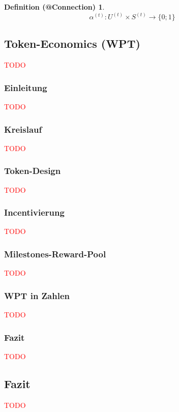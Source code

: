 \documentclass[11pt]{scrartcl}
\makeatletter
\newtheorem{def_connections}{Definition (@Connection)}
\newcommand\todo[1]{\textcolor{red}{#1}}
\makeatother
\begin{document}
\begin{def_connections}
\begin{equation*}
  \alpha^{(t)} : U^{(t)} \times S^{(t)} \rightarrow \{0; 1\}
\end{equation*}
\end{def_connections}


\subsection{Token-Economics (WPT)}
\label{sec:eco_wpt}
\todo{TODO}

\subsubsection{Einleitung}
\label{sec:wpt_einleitung}
\todo{TODO}

\subsubsection{Kreislauf}
\label{sec:wpt_kreislauf}
\todo{TODO}

\subsubsection{Token-Design}
\label{sec:wpt_design}
\todo{TODO}

\subsubsection{Incentivierung}
\label{sec:wpt_incent}
\todo{TODO}

\subsubsection{Milestones-Reward-Pool}
\label{sec:wpt_reward_pool}
\todo{TODO}

\subsubsection{WPT in Zahlen}
\label{sec:wpt_zahlen}
\todo{TODO}

\subsubsection{Fazit}
\label{sec:wpt_fazit}
\todo{TODO}


\subsection{Fazit}
\label{sec:eco_fazit}
\todo{TODO}
\end{document}
